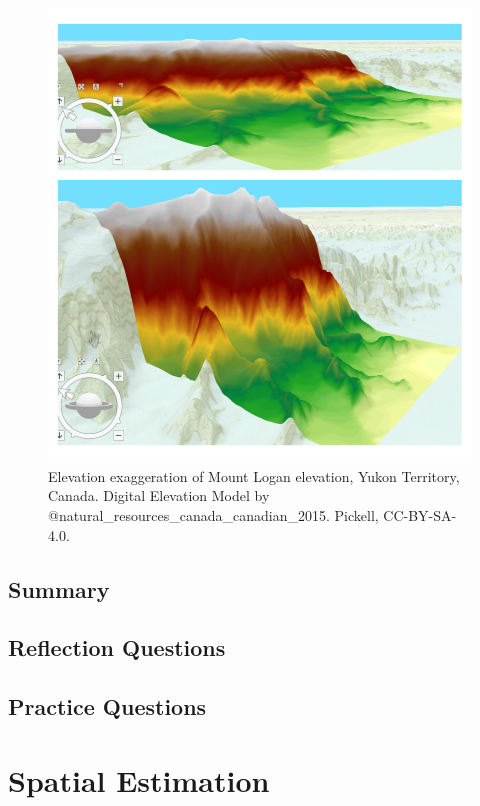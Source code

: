 \documentclass[
]{book}
\begin{document}
\begin{figure}
\includegraphics[width=0.75\linewidth]{images/09-mount-logan-exaggeration} \caption{Elevation exaggeration of Mount Logan elevation, Yukon Territory, Canada. Digital Elevation Model by @natural_resources_canada_canadian_2015. Pickell, CC-BY-SA-4.0.}\label{fig:9-mount-logan-exaggeration}
\end{figure}

\hypertarget{summary-3}{%
\section{Summary}\label{summary-3}}

\hypertarget{reflection-questions-5}{%
\section*{Reflection Questions}\label{reflection-questions-5}}

\hypertarget{practice-questions-4}{%
\section*{Practice Questions}\label{practice-questions-4}}

\hypertarget{spatial-estimation}{%
\chapter{Spatial Estimation}\label{spatial-estimation}}
\end{document}
